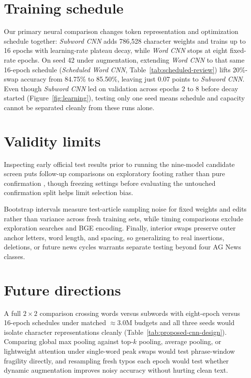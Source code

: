 \section{Training schedule}
Our primary neural comparison changes token representation and optimization schedule together: \textit{Subword CNN} adds 786,528 character weights and trains up to 16 epochs with learning-rate plateau decay, while \textit{Word CNN} stops at eight fixed-rate epochs. On seed 42 under augmentation, extending \textit{Word CNN} to that same 16-epoch schedule (\textit{Scheduled Word CNN}, Table~\ref{tab:scheduled-review}) lifts 20\%-swap accuracy from 84.75\% to 85.50\%, leaving just 0.07 points to \textit{Subword CNN}. Even though \textit{Subword CNN} led on validation across epochs 2 to 8 before decay started (Figure~\ref{fig:learning}), testing only one seed means schedule and capacity cannot be separated cleanly from these runs alone.

\newpage
\section{Validity limits}\label{sec:limitations}
Inspecting early official test results prior to running the nine-model candidate screen puts follow-up comparisons on exploratory footing rather than pure confirmation \citep{cawley2010}, though freezing settings before evaluating the untouched confirmation split helps limit selection bias.

Bootstrap intervals measure test-article sampling noise for fixed weights and edits rather than variance across fresh training sets, while timing comparisons exclude exploration searches and BGE encoding. Finally, interior swaps preserve outer anchor letters, word length, and spacing, so generalizing to real insertions, deletions, or future news cycles warrants separate testing beyond four AG News classes.

\section{Future directions}
A full $2 \times 2$ comparison crossing words versus subwords with eight-epoch versus 16-epoch schedules under matched $\approx 3.0\mathrm{M}$ budgets and all three seeds would isolate character representations cleanly (Table~\ref{tab:proposed-cnn-design}). Comparing global max pooling against top-$k$ pooling, average pooling, or lightweight attention under single-word peak swaps would test phrase-window fragility directly, and resampling fresh typos each epoch would test whether dynamic augmentation improves noisy accuracy without hurting clean text.

